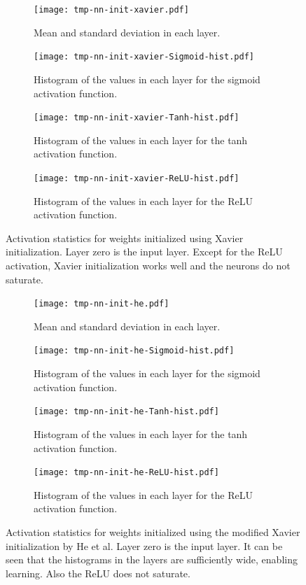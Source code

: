 			\begin{figure}
				\centering
				\begin{subfigure}{\linewidth}
					\texttt{[image: tmp-nn-init-xavier.pdf]}
					\caption{Mean and standard deviation in each layer.}
				\end{subfigure}
				\begin{subfigure}{\linewidth}
					\texttt{[image: tmp-nn-init-xavier-Sigmoid-hist.pdf]}
					\caption{Histogram of the values in each layer for the sigmoid activation function.}
				\end{subfigure}
				\begin{subfigure}{\linewidth}
					\texttt{[image: tmp-nn-init-xavier-Tanh-hist.pdf]}
					\caption{Histogram of the values in each layer for the tanh activation function.}
				\end{subfigure}
				\begin{subfigure}{\linewidth}
					\texttt{[image: tmp-nn-init-xavier-ReLU-hist.pdf]}
					\caption{Histogram of the values in each layer for the ReLU activation function.}
				\end{subfigure}
				\caption{Activation statistics for weights initialized using Xavier initialization. Layer zero is the input layer. Except for the ReLU activation, Xavier initialization works well and the neurons do not saturate.}
				\label{fig:nnInitXavier}
			\end{figure}

			\begin{figure}
				\centering
				\begin{subfigure}{\linewidth}
					\texttt{[image: tmp-nn-init-he.pdf]}
					\caption{Mean and standard deviation in each layer.}
				\end{subfigure}
				\begin{subfigure}{\linewidth}
					\texttt{[image: tmp-nn-init-he-Sigmoid-hist.pdf]}
					\caption{Histogram of the values in each layer for the sigmoid activation function.}
				\end{subfigure}
				\begin{subfigure}{\linewidth}
					\texttt{[image: tmp-nn-init-he-Tanh-hist.pdf]}
					\caption{Histogram of the values in each layer for the tanh activation function.}
				\end{subfigure}
				\begin{subfigure}{\linewidth}
					\texttt{[image: tmp-nn-init-he-ReLU-hist.pdf]}
					\caption{Histogram of the values in each layer for the ReLU activation function.}
				\end{subfigure}
				\caption{Activation statistics for weights initialized using the modified Xavier initialization by He et al. Layer zero is the input layer. It can be seen that the histograms in the layers are sufficiently wide, enabling learning. Also the ReLU does not saturate.}
				\label{fig:nnInitHe}
			\end{figure}

